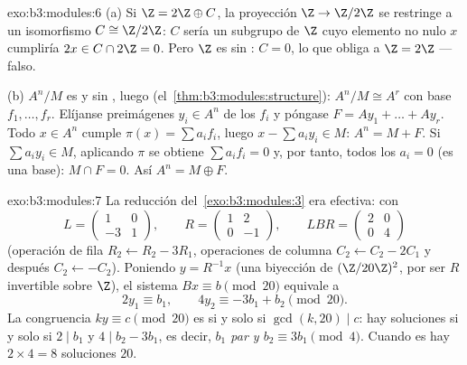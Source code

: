 \begin{solution}{exo:b3:modules:6}
(a) Si $\Z = 2\Z \oplus C$, la proyección $\Z \to \Z/2\Z$ se restringe a
un isomorfismo $C \cong \Z/2\Z$: $C$ sería un subgrupo de $\Z$ cuyo
elemento no nulo $x$ cumpliría $2x \in C
\cap 2\Z = 0$. Pero $\Z$ es sin
: $C = 0$, lo que obliga a $\Z =
2\Z$ --- falso.

(b) $A^n/M$ es  y
sin , luego
(el~\cref{thm:b3:modules:structure}): $A^n/M \cong A^r$ con base
$f_1, \dots, f_r$. Elíjanse preimágenes $y_i \in A^n$ de los $f_i$ y
póngase $F = Ay_1 + \dots + Ay_r$. Todo $x \in A^n$ cumple $\pi(x)
= \sum a_if_i$, luego $x - \sum a_iy_i \in M$: $A^n = M + F$. Si
$\sum a_iy_i \in M$, aplicando $\pi$ se obtiene $\sum a_if_i = 0$ y, por
tanto, todos los $a_i = 0$ (es una base): $M \cap F = 0$. Así
$A^n = M \oplus
F$.
\end{solution}

\begin{solution}{exo:b3:modules:7}
La reducción del~\cref{exo:b3:modules:3} era efectiva: con
\[
L = \begin{pmatrix} 1 & 0\\ -3 & 1\end{pmatrix},
\qquad
R = \begin{pmatrix} 1 & 2\\ 0 & -1 \end{pmatrix},
\qquad
LBR = \begin{pmatrix} 2 & 0\\ 0 & 4\end{pmatrix}
\]
(operación de fila $R_2 \leftarrow R_2 - 3R_1$, operaciones de columna
$C_2 \leftarrow C_2 - 2C_1$ y después $C_2 \leftarrow -C_2$). Poniendo
$y = R^{-1}x$ (una biyección de $(\Z/20\Z)^2$, por ser $R$ invertible
sobre $\Z$), el sistema $Bx \equiv b \pmod{20}$ equivale a
\[
2y_1 \equiv b_1, \qquad 4y_2 \equiv -3b_1 + b_2 \pmod{20}.
\]
La congruencia $ky \equiv c \pmod{20}$ es
 si y solo si
$\gcd(k, 20) \mid c$: hay soluciones si y solo si $2 \mid b_1$ y $4
\mid b_2 - 3b_1$, es decir, \emph{$b_1$ par y $b_2 \equiv 3b_1
\pmod 4$}. Cuando es  hay
$2 \times 4 = 8$ soluciones  $20$.
\end{solution}

